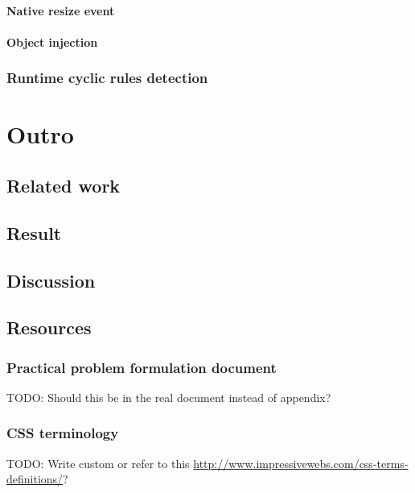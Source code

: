\documentclass[a4paper,11pt]{kth-mag}
\begin{document}
        \subsection{Native resize event}
        \subsection{Object injection}
      \section{Runtime cyclic rules detection}

  \part{Outro}
    \chapter{Related work}
    \chapter{Result}
    \chapter{Discussion}
  \printbibliography
    \appendix
    \addappheadtotoc
      \chapter{Resources}
        \section{Practical problem formulation document}\label{sec:problem-formulation}
          TODO: Should this be in the real document instead of appendix?          
        \section{CSS terminology}
          TODO: Write custom or refer to this \url{http://www.impressivewebs.com/css-terms-definitions/}?
\end{document}
